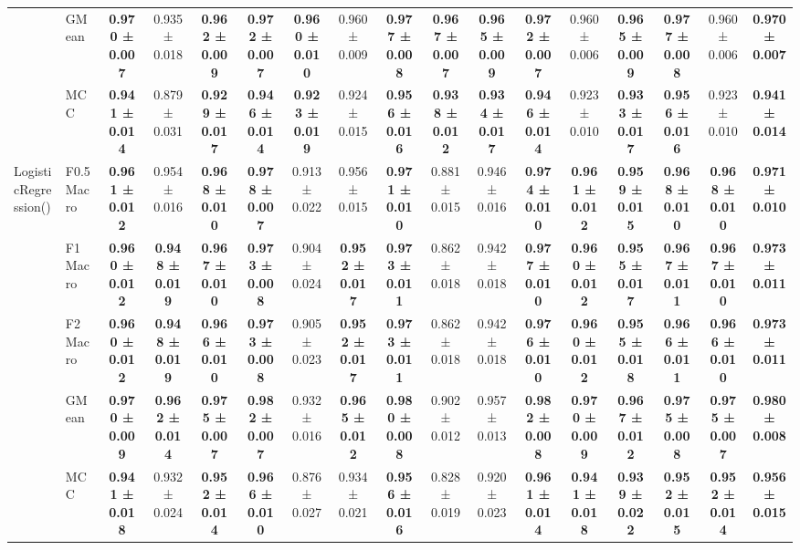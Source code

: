 \begin{table}[H]
{\begin{tabular}{llccccccccccccccc}
 & GMean & \textbf{0.970 ± 0.007} & 0.935 ± 0.018 & \textbf{0.962 ± 0.009} & \textbf{0.972 ± 0.007} & \textbf{0.960 ± 0.010} & 0.960 ± 0.009 & \textbf{0.977 ± 0.008} & \textbf{0.967 ± 0.007} & \textbf{0.965 ± 0.009} & \textbf{0.972 ± 0.007} & 0.960 ± 0.006 & \textbf{0.965 ± 0.009} & \textbf{0.977 ± 0.008} & 0.960 ± 0.006 & \textbf{0.970 ± 0.007} \\
 & MCC & \textbf{0.941 ± 0.014} & 0.879 ± 0.031 & \textbf{0.929 ± 0.017} & \textbf{0.946 ± 0.014} & \textbf{0.923 ± 0.019} & 0.924 ± 0.015 & \textbf{0.956 ± 0.016} & \textbf{0.938 ± 0.012} & \textbf{0.934 ± 0.017} & \textbf{0.946 ± 0.014} & 0.923 ± 0.010 & \textbf{0.933 ± 0.017} & \textbf{0.956 ± 0.016} & 0.923 ± 0.010 & \textbf{0.941 ± 0.014} \\
\cline{1-17}
\multirow[t]{5}{*}{LogisticRegression()} & F0.5 Macro & \textbf{0.961 ± 0.012} & 0.954 ± 0.016 & \textbf{0.968 ± 0.010} & \textbf{0.978 ± 0.007} & 0.913 ± 0.022 & 0.956 ± 0.015 & \textbf{0.971 ± 0.010} & 0.881 ± 0.015 & 0.946 ± 0.016 & \textbf{0.974 ± 0.010} & \textbf{0.961 ± 0.012} & \textbf{0.959 ± 0.015} & \textbf{0.968 ± 0.010} & \textbf{0.968 ± 0.010} & \textbf{0.971 ± 0.010} \\
 & F1 Macro & \textbf{0.960 ± 0.012} & \textbf{0.948 ± 0.019} & \textbf{0.967 ± 0.010} & \textbf{0.973 ± 0.008} & 0.904 ± 0.024 & \textbf{0.952 ± 0.017} & \textbf{0.973 ± 0.011} & 0.862 ± 0.018 & 0.942 ± 0.018 & \textbf{0.977 ± 0.010} & \textbf{0.960 ± 0.012} & \textbf{0.955 ± 0.017} & \textbf{0.967 ± 0.011} & \textbf{0.967 ± 0.010} & \textbf{0.973 ± 0.011} \\
 & F2 Macro & \textbf{0.960 ± 0.012} & \textbf{0.948 ± 0.019} & \textbf{0.966 ± 0.010} & \textbf{0.973 ± 0.008} & 0.905 ± 0.023 & \textbf{0.952 ± 0.017} & \textbf{0.973 ± 0.011} & 0.862 ± 0.018 & 0.942 ± 0.018 & \textbf{0.976 ± 0.010} & \textbf{0.960 ± 0.012} & \textbf{0.955 ± 0.018} & \textbf{0.966 ± 0.011} & \textbf{0.966 ± 0.010} & \textbf{0.973 ± 0.011} \\
 & GMean & \textbf{0.970 ± 0.009} & \textbf{0.962 ± 0.014} & \textbf{0.975 ± 0.007} & \textbf{0.982 ± 0.007} & 0.932 ± 0.016 & \textbf{0.965 ± 0.012} & \textbf{0.980 ± 0.008} & 0.902 ± 0.012 & 0.957 ± 0.013 & \textbf{0.982 ± 0.008} & \textbf{0.970 ± 0.009} & \textbf{0.967 ± 0.012} & \textbf{0.975 ± 0.008} & \textbf{0.975 ± 0.007} & \textbf{0.980 ± 0.008} \\
 & MCC & \textbf{0.941 ± 0.018} & 0.932 ± 0.024 & \textbf{0.952 ± 0.014} & \textbf{0.966 ± 0.010} & 0.876 ± 0.027 & 0.934 ± 0.021 & \textbf{0.956 ± 0.016} & 0.828 ± 0.019 & 0.920 ± 0.023 & \textbf{0.961 ± 0.014} & \textbf{0.941 ± 0.018} & \textbf{0.939 ± 0.022} & \textbf{0.952 ± 0.015} & \textbf{0.952 ± 0.014} & \textbf{0.956 ± 0.015} \\

\end{tabular}}
\end{table}
